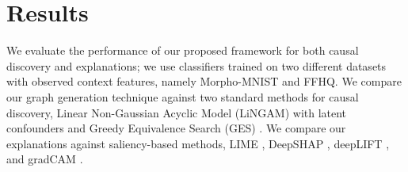 \documentclass{article}
\newcommand{\ftcom}[2][]{\todo[author=FT, #1]{#2}}
\begin{document}




\section{Results}
\label{sec:results}
We evaluate the performance of our proposed framework for both causal discovery and explanations; we use classifiers trained on two different datasets with observed context features, namely Morpho-MNIST\cite{castro2019morpho} and FFHQ\cite{karras2019style}.
We compare our graph generation technique against two standard methods for causal discovery, Linear Non-Gaussian Acyclic Model (LiNGAM) with latent confounders \cite{maeda2020rcd} and Greedy Equivalence Search (GES) \cite{chickering2002optimal}.
We compare our explanations against saliency-based methods, LIME \cite{ribeiro2016should}, DeepSHAP \cite{SHAP}, deepLIFT \cite{deeplift}, and gradCAM \cite{selvaraju2017grad}.
\end{document}
